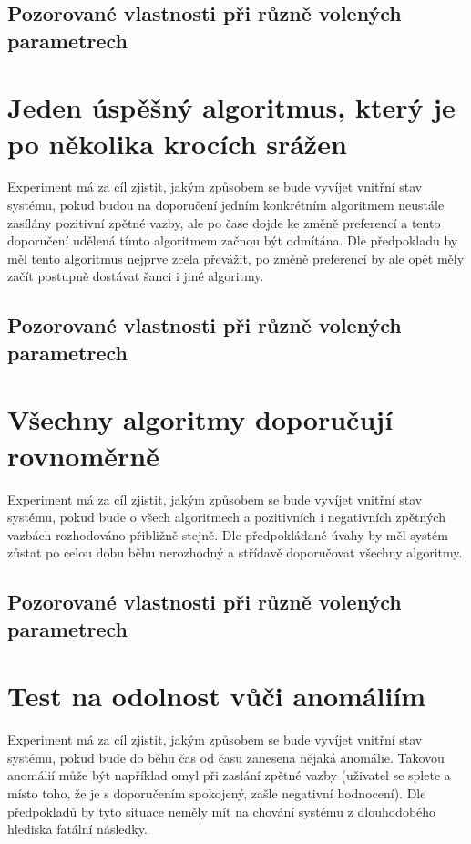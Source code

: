 \documentclass[thesis=M,czech]{FITthesis}[2014/05/07]
\begin{document}
\subsection{Pozorované vlastnosti při různě volených parametrech}

\section{Jeden úspěšný algoritmus, který je po několika krocích srážen}
Experiment má za cíl zjistit, jakým způsobem se bude vyvíjet vnitřní stav systému, pokud budou na doporučení jedním konkrétním algoritmem neustále zasílány pozitivní zpětné vazby, ale po čase dojde ke změně preferencí a tento doporučení udělená tímto algoritmem začnou být odmítána. Dle předpokladu by měl tento algoritmus nejprve zcela převážit, po změně preferencí by ale opět měly začít postupně dostávat šanci i jiné algoritmy.

\subsection{Pozorované vlastnosti při různě volených parametrech}

\section{Všechny algoritmy doporučují rovnoměrně}
Experiment má za cíl zjistit, jakým způsobem se bude vyvíjet vnitřní stav systému, pokud bude o všech algoritmech a pozitivních i negativních zpětných vazbách rozhodováno přibližně stejně. Dle předpokládané úvahy by měl systém zůstat po celou dobu běhu nerozhodný a střídavě doporučovat všechny algoritmy.

\subsection{Pozorované vlastnosti při různě volených parametrech}

\section{Test na odolnost vůči anomáliím}
Experiment má za cíl zjistit, jakým způsobem se bude vyvíjet vnitřní stav systému, pokud bude do běhu čas od času zanesena nějaká anomálie. Takovou anomálií může být například omyl při zaslání zpětné vazby (uživatel se splete a místo toho, že je s doporučením spokojený, zašle negativní hodnocení). Dle předpokladů by tyto situace neměly mít na chování systému z dlouhodobého hlediska fatální následky.
\end{document}
